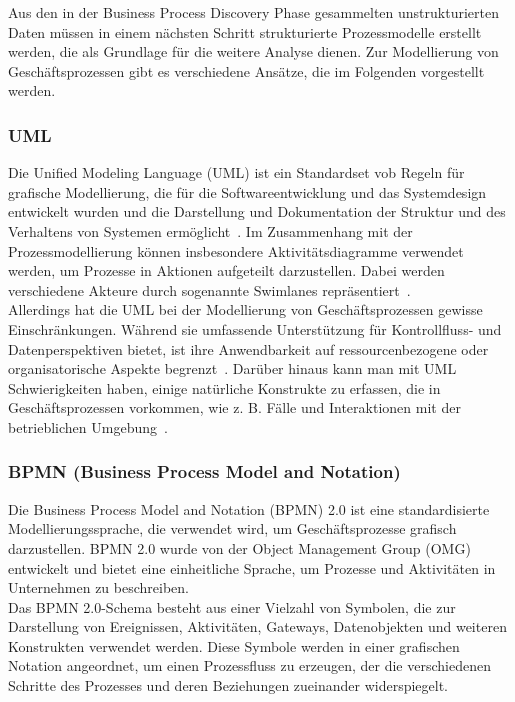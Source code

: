 Aus den in der Business Process Discovery Phase gesammelten unstrukturierten Daten müssen in einem nächsten Schritt strukturierte Prozessmodelle erstellt werden, die als Grundlage für die weitere Analyse dienen.
Zur Modellierung von Geschäftsprozessen gibt es verschiedene Ansätze, die im Folgenden vorgestellt werden.

\subsubsection{UML}
Die Unified Modeling Language (UML) ist ein Standardset vob Regeln für grafische Modellierung, die für die Softwareentwicklung und das Systemdesign entwickelt wurden und die Darstellung und Dokumentation der Struktur und des Verhaltens von Systemen ermöglicht~\cite{OMG2017}.
Im Zusammenhang mit der Prozessmodellierung können insbesondere Aktivitätsdiagramme verwendet werden, um Prozesse in Aktionen aufgeteilt darzustellen. Dabei werden verschiedene Akteure durch sogenannte Swimlanes repräsentiert~\cite{List2006}.\\

Allerdings hat die UML bei der Modellierung von Geschäftsprozessen gewisse Einschränkungen.
Während sie umfassende Unterstützung für Kontrollfluss- und Datenperspektiven bietet, ist ihre Anwendbarkeit auf ressourcenbezogene oder organisatorische Aspekte begrenzt~\cite{Russell2006}.
Darüber hinaus kann man mit UML Schwierigkeiten haben, einige natürliche Konstrukte zu erfassen, die in Geschäftsprozessen vorkommen, wie z. B. Fälle und Interaktionen mit der betrieblichen Umgebung~\cite{Russell2006}.


\subsubsection{BPMN (Business Process Model and Notation)}

Die Business Process Model and Notation (BPMN) 2.0 ist eine standardisierte Modellierungssprache, die verwendet wird, um Geschäftsprozesse grafisch darzustellen.
BPMN 2.0 wurde von der Object Management Group (OMG) entwickelt und bietet eine einheitliche Sprache, um Prozesse und Aktivitäten in Unternehmen zu beschreiben.\\
Das BPMN 2.0-Schema besteht aus einer Vielzahl von Symbolen, die zur Darstellung von Ereignissen, Aktivitäten, Gateways, Datenobjekten und weiteren Konstrukten verwendet werden.
Diese Symbole werden in einer grafischen Notation angeordnet, um einen Prozessfluss zu erzeugen, der die verschiedenen Schritte des Prozesses und deren Beziehungen zueinander widerspiegelt.

